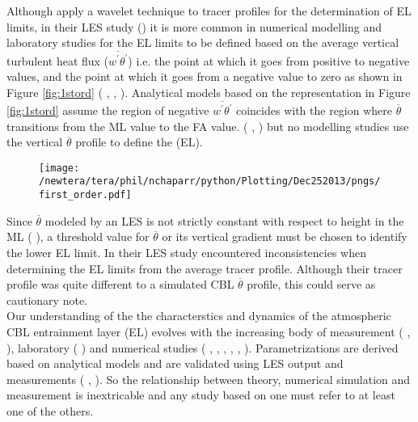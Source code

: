 Although \citeauthor{BrooksFowler2} apply a wavelet technique to tracer profiles for the determination of \acs{EL} limits, in their \acs{LES} study (\cite{BrooksFowler2}) it is more common in numerical modelling and laboratory studies for the \acs{EL} limits to be defined based on the average vertical turbulent heat flux ($\overline{w^{'}\theta^{'}}$) i.e. the point at which it goes from positive to negative values, and the point at which it goes from a negative value to zero as shown in Figure \ref{fig:1stord} (\citeauthor{DearWill80} \citeyear{DearWill80}, \citeauthor{FedConzMir04} \citeyear{FedConzMir04}, \citeauthor{GarciaMellado} \citeyear{GarciaMellado}). Analytical models based on the representation in Figure \ref{fig:1stord} assume the region of negative $\overline{w^{'}\theta^{'}}$ coincides with the region where $\overline{\theta}$ transitions from the \acs{ML} value to the \acs{FA} value. (\citeauthor{Deardorff79} \citeyear{Deardorff79}, \citeauthor{FedConzMir04} \citeyear{FedConzMir04}) but no modelling studies use the vertical $\overline{\theta}$ profile to define the (\acs{EL}).\\

\begin{figure}[htbp]
    \centering
    \texttt{[image: /newtera/tera/phil/nchaparr/python/Plotting/Dec252013/pngs/first\_order.pdf]}
    \caption{}
    \label{fig:1storder}   %
\end{figure}

Since $\overline{\theta}$ modeled by an \acs{LES} is not strictly constant with respect to height in the \acs{ML} (\citeauthor{FedConzMir04} \citeyear{FedConzMir04}), a threshold value for $\overline{\theta}$ or its vertical gradient must be chosen to identify the lower \acs{EL} limit.  In their \citeyear{BrooksFowler2} \acs{LES} study \citeauthor{BrooksFowler2} encountered inconsistencies when determining the \acs{EL} limits from the average tracer profile.  Although their tracer profile was quite different to a simulated \acs{CBL} $\overline{\theta}$ profile, this could serve as cautionary note.\\             

Our understanding of the the characterstics and dynamics of the atmospheric \acs{CBL} entrainment layer (\acs{EL}) evolves with the increasing body of measurement (\citeauthor{Traum11} \citeyear{Traum11}, \citeauthor{StullNelEl} \citeyear{StullNelEl}), laboratory (\citeauthor{DearWill80} \citeyear{DearWill80}) and numerical studies (\citeauthor{Deardorff72} \citeyear{Deardorff72}, \citeauthor{Sorbjan} \citeyear{Sorbjan}, \citeauthor{SullMoengStev} \citeyear{SullMoengStev}, \citeauthor{FedConzMir04} \citeyear{FedConzMir04}, \citeauthor{BrooksFowler2} \citeyear{BrooksFowler2}, \citeauthor{GarciaMellado} \citeyear{GarciaMellado}). Parametrizations are derived based on analytical models and are validated using \acs{LES} output and measurements (\citeauthor{FedConzMir04} \citeyear{FedConzMir04}, \citeauthor{Boers89} \citeyear{Boers89}).  So the relationship between theory, numerical simulation and measurement is inextricable and any study based on one must refer to at least one of the others.\\  

